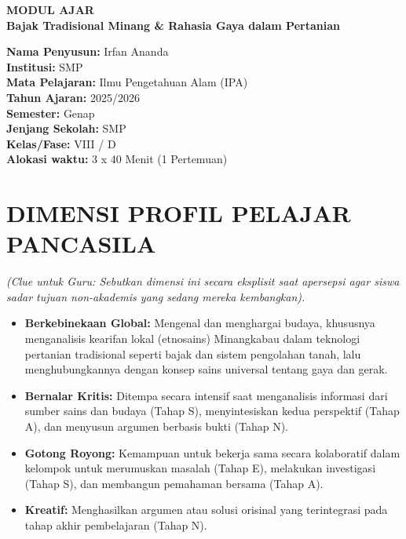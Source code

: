 \documentclass[12pt,a4paper]{article}
\begin{document}
\begin{center}
{\Huge\textbf{MODUL AJAR}}\\
\vspace{0.5cm}
{\Large\textbf{Bajak Tradisional Minang \& Rahasia Gaya dalam Pertanian}}
\end{center}

\vspace{1cm}

\begin{tcolorbox}[colback=white,colframe=black,boxrule=1pt]
\textbf{Nama Penyusun:} Irfan Ananda\\
\textbf{Institusi:} SMP\\
\textbf{Mata Pelajaran:} Ilmu Pengetahuan Alam (IPA)\\
\textbf{Tahun Ajaran:} 2025/2026\\
\textbf{Semester:} Genap\\
\textbf{Jenjang Sekolah:} SMP\\
\textbf{Kelas/Fase:} VIII / D\\
\textbf{Alokasi waktu:} 3 x 40 Menit (1 Pertemuan)
\end{tcolorbox}

\section{DIMENSI PROFIL PELAJAR PANCASILA}
\textit{(Clue untuk Guru: Sebutkan dimensi ini secara eksplisit saat apersepsi agar siswa sadar tujuan non-akademis yang sedang mereka kembangkan).}

\begin{itemize}
\item \textbf{Berkebinekaan Global:} Mengenal dan menghargai budaya, khususnya menganalisis kearifan lokal (etnosains) Minangkabau dalam teknologi pertanian tradisional seperti bajak dan sistem pengolahan tanah, lalu menghubungkannya dengan konsep sains universal tentang gaya dan gerak.
\item \textbf{Bernalar Kritis:} Ditempa secara intensif saat menganalisis informasi dari sumber sains dan budaya (Tahap S), menyintesiskan kedua perspektif (Tahap A), dan menyusun argumen berbasis bukti (Tahap N).
\item \textbf{Gotong Royong:} Kemampuan untuk bekerja sama secara kolaboratif dalam kelompok untuk merumuskan masalah (Tahap E), melakukan investigasi (Tahap S), dan membangun pemahaman bersama (Tahap A).
\item \textbf{Kreatif:} Menghasilkan argumen atau solusi orisinal yang terintegrasi pada tahap akhir pembelajaran (Tahap N).
\end{itemize}
\end{document}
